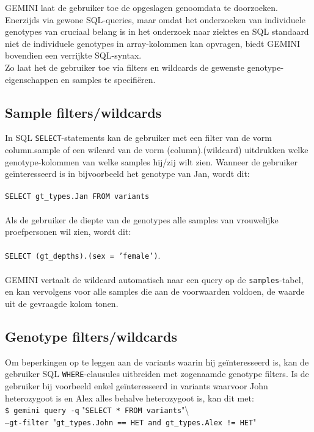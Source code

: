 GEMINI laat de gebruiker toe de opgeslagen genoomdata te doorzoeken. Enerzijds via gewone SQL-queries, maar omdat het onderzoeken van individuele genotypes van cruciaal belang is in het onderzoek naar ziektes en SQL standaard niet de individuele genotypes in array-kolommen kan opvragen, biedt GEMINI bovendien een verrijkte SQL-syntax.\\
Zo laat het de gebruiker toe via filters en wildcards de gewenste genotype-eigenschappen en samples te specifi\"eren.

\subsection{Sample filters/wildcards} 
In SQL \texttt{SELECT}-statements kan de gebruiker met een filter van de vorm column.sample of een wilcard van de vorm (column).(wildcard) uitdrukken welke genotype-kolommen van welke samples hij/zij wilt zien. Wanneer de gebruiker ge\"interesseerd is in bijvoorbeeld het genotype van Jan, wordt dit:\\\\
\texttt{SELECT gt\_types.Jan FROM variants}\\\\
Als de gebruiker de diepte van de genotypes alle samples van vrouwelijke proefpersonen wil zien, wordt dit:\\\\
\texttt{SELECT (gt\_depths).(sex = 'female')}.\\\\
GEMINI vertaalt de wildcard automatisch naar een query op de \texttt{samples}-tabel, en kan vervolgens voor alle samples die aan de voorwaarden voldoen, de waarde uit de gevraagde kolom tonen.

\subsection{Genotype filters/wildcards}
Om beperkingen op te leggen aan de variants waarin hij ge\"interesseerd is, kan de gebruiker SQL \texttt{WHERE}-clausules uitbreiden met zogenaamde genotype filters. Is de gebruiker bij voorbeeld enkel ge\"interesseerd in variants waarvoor John heterozygoot is en Alex alles behalve heterozygoot is, kan dit met:\\

\noindent\texttt{\$ gemini query -q} "\texttt{SELECT * FROM variants}"\textbackslash \\\texttt{--gt-filter }"\texttt{gt\_types.John == HET and gt\_types.Alex != HET}"\\


